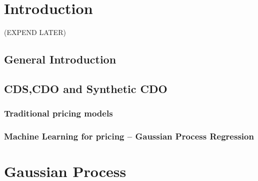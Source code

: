 \documentclass[11pt,a4paper]{article}
\theoremstyle{definition}
\numberwithin{equation}{section}
\begin{document}
%
%

\setcounter{tocdepth}{4}

\tableofcontents %
 
\newpage %

\fancyhead{}
\fancyfoot{}
\pagestyle{fancy} 
\fancyhead[RO,LE]{\sffamily\small \thepage}
\fancyhead[LO,RE]{\sffamily\small \nouppercase{\rightmark}}
\renewcommand{\headrulewidth}{0.35pt}
\renewcommand{\footrulewidth}{0.0pt}





\section{Introduction}
(EXPEND LATER)
\subsection{General Introduction}

\subsection{CDS,CDO and Synthetic CDO}

\subsubsection{Traditional pricing models}

\subsubsection{Machine Learning for pricing -- Gaussian Process Regression}


\newpage
\section{Gaussian Process}
\end{document}
